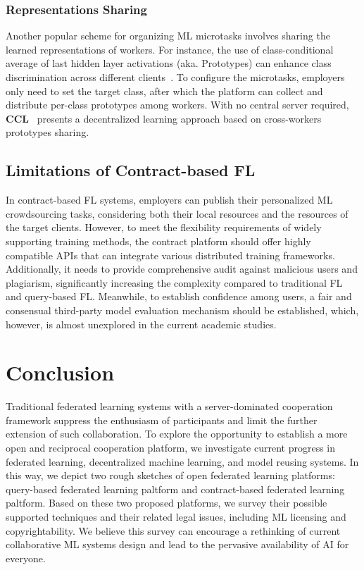 \subsubsection{Representations Sharing}
Another popular scheme for organizing ML microtasks involves sharing the learned representations of workers. 
For instance, the use of class-conditional average of last hidden layer activations (aka. Prototypes) can enhance class discrimination across different clients~\cite{aketi2024cross, tan2022fedproto, michieli2021prototype, berdoz2022scalable}.
To configure the microtasks, employers only need to set the target class, after which the platform can collect and distribute per-class prototypes among workers.
With no central server required, \textbf{CCL}~\cite{aketi2024cross} presents a decentralized learning approach based on cross-workers prototypes sharing.

\subsection{Limitations of Contract-based FL}
\label{sec:limitations_cbfl}
In contract-based FL systems, employers can publish their personalized ML crowdsourcing tasks, considering both their local resources and the resources of the target clients. 
However, to meet the flexibility requirements of widely supporting training methods, the contract platform should offer highly compatible APIs that can integrate various distributed training frameworks. 
Additionally, it needs to provide comprehensive audit against malicious users and plagiarism, significantly increasing the complexity compared to traditional FL and query-based FL.
Meanwhile, to establish confidence among users, a fair and consensual third-party model evaluation mechanism should be established, which, however, is almost unexplored in the current academic studies.



\section{Conclusion}
\label{sec:conclusion}
Traditional federated learning systems with a server-dominated cooperation framework suppress the enthusiasm of participants and limit the further extension of such collaboration. 
To explore the opportunity to establish a more open and reciprocal cooperation platform, we investigate current progress in federated learning, decentralized machine learning, and model reusing systems. 
In this way, we depict two rough sketches of open federated learning platforms: query-based federated learning paltform and contract-based federated learning paltform. 
Based on these two proposed platforms, we survey their possible supported techniques and their related legal issues, including ML licensing and copyrightability. 
We believe this survey can encourage a rethinking of current collaborative ML systems design and lead to the pervasive availability of AI for everyone.



